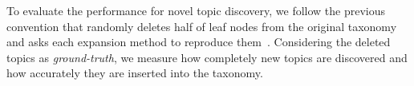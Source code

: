     

To evaluate the performance for novel topic discovery, 
we follow the previous convention that randomly deletes half of leaf nodes from the original taxonomy and asks each expansion method to reproduce them~\cite{shen2020taxoexpan, lee2022taxocom}.
Considering the deleted topics as \textit{ground-truth}, we measure how completely new topics are discovered and how accurately they are inserted into the taxonomy.


\begin{table}[t]
\small
\caption{The statistics of the datasets.}
\label{tbl:datastats}
\centering
{}
\end{table}

